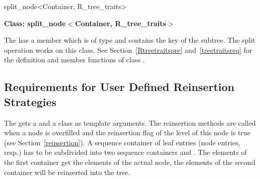 \begin{ccClassTemplate}{split_node<Container,
    R_tree_traits>}

\noindent
{\bf Class: split\_node$<$Container,
    R\_tree\_traits$>$}


\ccDefinition
The  has a member
 which is of
type  and contains the key of the subtree.
The split operation works
on this class. 
See Section~\ref{Rtreetraitspre} and~\ref{treetraitsreq} for the definition and member
functions of class .


\ccCreation
{}

\ccOperations
{}

\end{ccClassTemplate}


\subsection{Requirements for User Defined Reinsertion Strategies}
\label{userreinsert}
\label{reinsertreq}
The  gets a  and a
  class as template
arguments. 
The reinsertion methods are called when a node is
overfilled and the reinsertion flag of the level of this node 
 is true (see Section~\ref{reinsertion}).
A sequence container of leaf  entries (node
entries, resp.) has to be subdivided into two sequence containers 
 and . The elements of the
first container get the elements of the actual node, the elements 
of the second container will be reinserted into the tree.


